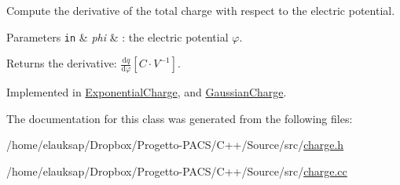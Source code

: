 Compute the derivative of the total charge with respect to the electric potential. 


\begin{DoxyParams}[1]{Parameters}
\mbox{\tt in}  & {\em phi} & \-: the electric potential $ \varphi $. \\
\hline
\end{DoxyParams}
\begin{DoxyReturn}{Returns}
the derivative\-: $ \frac{\mathrm{d}q}{\mathrm{d}\varphi} \left[ C \cdot V^{-1} \right] $. 
\end{DoxyReturn}


Implemented in \hyperlink{classExponentialCharge_a06f7a60ee2bce4590e2a12286aa0e9eb}{Exponential\-Charge}, and \hyperlink{classGaussianCharge_a06f7a60ee2bce4590e2a12286aa0e9eb}{Gaussian\-Charge}.



The documentation for this class was generated from the following files\-:\begin{DoxyCompactItemize}
\item 
/home/elauksap/\-Dropbox/\-Progetto-\/\-P\-A\-C\-S/\-C++/\-Source/src/\hyperlink{charge_8h}{charge.\-h}\item 
/home/elauksap/\-Dropbox/\-Progetto-\/\-P\-A\-C\-S/\-C++/\-Source/src/\hyperlink{charge_8cc}{charge.\-cc}\end{DoxyCompactItemize}

